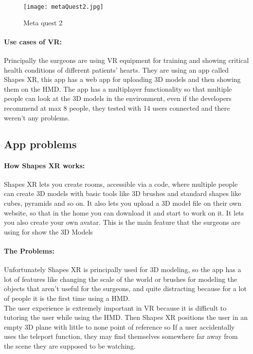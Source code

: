 \begin{figure}[ht]
  \centering
  \texttt{[image: metaQuest2.jpg]}
  \caption{Meta quest 2}
  \label{fig:metaQuest2}
\end{figure}

\paragraph{Use cases of VR:}
Principally the surgeons are using VR equipment for training and showing critical health conditions of different patients' hearts.
They are using an app called Shapes XR, this app has a web app for uploading 3D models and then showing them on the \ac{HMD}.
The app has a multiplayer functionality so that multiple people can look at the 3D models in the environment, even if the developers recommend at max 8 people, they tested with 14 users connected and there weren't any problems.

\subsection{App problems}

\paragraph{How Shapes XR works:}
Shapes XR lets you create rooms, accessible via a code, where multiple people can create 3D models with basic tools like 3D brushes and standard shapes like cubes, pyramids and so on.
It also lets you upload a 3D model file on their own website, so that in the home you can download it and start to work on it.
It lets you also create your own avatar.
This is the main feature that the surgeons are using for show the 3D Models

\paragraph{The Problems:}
Unfortunately Shapes XR is principally used for 3D modeling, so the app has a lot of features like changing the scale of the world or brushes for modeling the objects that aren't useful for the surgeons,
and quite distracting because for a lot of people it is the first time using a \ac{HMD}.\\
The user experience is extremely important in \ac{VR} because it is difficult to tutoring the user while using the \ac{HMD}.
Then Shapes XR positions the user in an empty 3D plane with little to none point of reference so If a user accidentally uses the teleport function, they may find themselves somewhere far away from the scene they are supposed to be watching.

